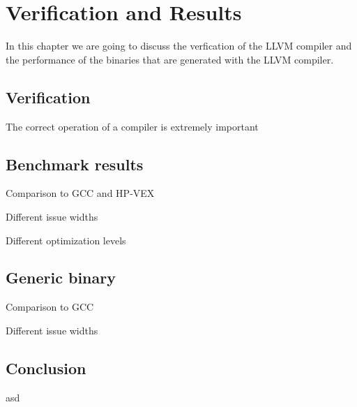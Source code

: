 \chapter{Verification and Results}
\label{chap:results}
In this chapter we are going to discuss the verfication of the LLVM compiler and the performance of the binaries that are generated with the LLVM compiler.

\section{Verification}
The correct operation of a compiler is extremely important

\section{Benchmark results}
Comparison to GCC and HP-VEX

Different issue widths

Different optimization levels

\section{Generic binary}
Comparison to GCC

Different issue widths

\section{Conclusion}
asd
\acresetall
